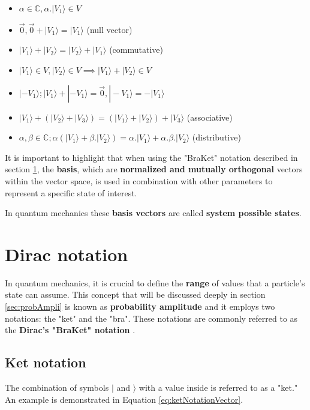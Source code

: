 		\begin{itemize}
			\item $\alpha \in \mathbb{C}, \alpha . |V_1\rangle \in V$
			\item $\vec{0} , \vec{0} + |V_1\rangle = |V_1\rangle$ (null vector)
			\item $|V_1\rangle + |V_2\rangle = |V_2\rangle + |V_1\rangle$ (commutative)
			\item $|V_1\rangle \in V, |V_2\rangle \in V \implies |V_1\rangle + |V_2\rangle \in V$
			\item $|-V_1\rangle; |V_1\rangle + |-V_1\rangle=\vec{0}, |-V_1\rangle=-|V_1\rangle$ 
			\item $|V_1\rangle + (|V_2\rangle + |V_3\rangle) = (|V_1\rangle + |V_2\rangle) + |V_3\rangle$ (associative)
			\item $\alpha,\beta \in \mathbb{C}; \alpha (|V_1\rangle + \beta . |V_2\rangle) = \alpha . |V_1\rangle + \alpha . \beta . |V_2\rangle $ (distributive)
		\end{itemize}

		\par It is important to highlight that when using the "BraKet" notation described in section \ref{sec:DiracNotation}, the \textbf{basis}, which are \textbf{normalized and mutually orthogonal} vectors within the vector space, is used in combination with other parameters to represent a specific state of interest.\newline
		
		\par In quantum mechanics these \textbf{basis vectors} are called \textbf{system possible states}.
	
	\section{Dirac notation}
		\label{sec:DiracNotation}
			
		\par In quantum mechanics, it is crucial to define the \textbf{range} of values that a particle's state can assume. This concept that will be discussed deeply in section \ref{sec:probAmpli} is known as \textbf{probability amplitude} and it employs two notations: the "ket" and the "bra". These notations are commonly referred to as the \textbf{Dirac's "BraKet" notation} \cite{notacaoDirac}.

		\subsection{Ket notation}
			\label{sec:ketNotation}
			\par The combination of symbols $|$ and $\rangle$ with a value inside is referred to as a "ket." An example is demonstrated in Equation \ref{eq:ketNotationVector}.
			
